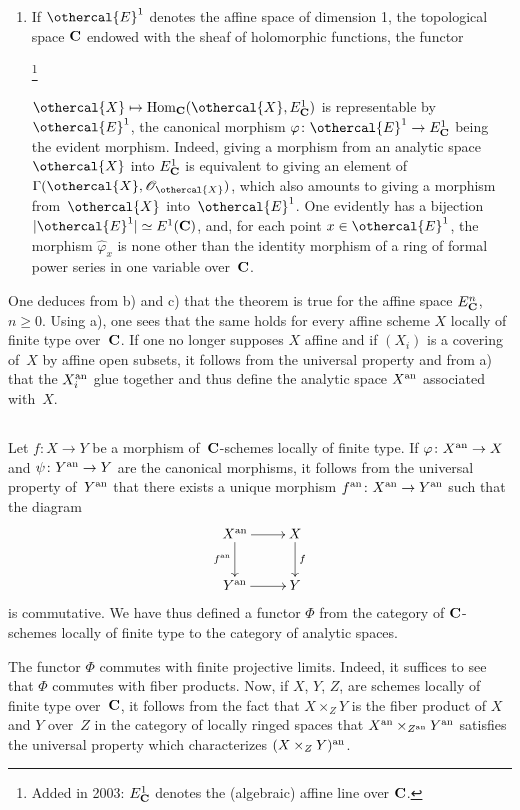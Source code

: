 \begin{enumerate}
\item [c)] If $\othercal{E}^1$ denotes the affine space of dimension 1,
\ie the topological space $\mathbf{C}$ endowed with the sheaf of holomorphic
functions, the functor%
{{\renewcommand{\thefootnote}{*}\addtocounter{footnote}{-1}\footnote{\lcrochetbf Added in 2003: $E^1_{\mathbf{C}}$ denotes the (algebraic) affine line over $\mathbf{C}$.\rcrochetbf}}}
$\othercal{X}\mto\Hom_\CC (\othercal{X},E^1_\CC)$
is representable by $\othercal{E}^1$, the canonical morphism
$\varphi\colon\othercal{E}^1\to E^1_\CC$ being the
evident morphism. Indeed, giving a morphism from an analytic space
$\othercal{X}$ into $E^1_{\mathbf{C}}$ is equivalent to giving an
element of~$\Gamma(\othercal{X},\cal{O}_\othercal{X})$, which also amounts
to giving a morphism from~$\othercal{X}$ into~$\othercal{E}^1$. One
evidently has a bijection $|\othercal{E}^1|\simeq E^1(\CC)$, and, for
each point $x\in\othercal{E}^1$, the morphism $\widehat\varphi_x$ is
none other than the identity morphism of a ring of formal power series
in one variable over~$\mathbf{C}$.
\end{enumerate}

One deduces from b) and c) that the theorem is true for
the affine space $E^n_{\mathbf{C}}$, $n\geq 0$. Using a), one sees that the same
holds for every affine scheme $X$ locally of finite
type over~$\mathbf{C}$. If one no longer supposes $X$ affine and if $(X_i)$ is
a covering of~$X$ by affine open subsets, it follows from the
universal property and from a) that the $X_i^{\mathrm{an}}$ glue together
and thus define the analytic space $X^{\mathrm{an}}$ associated
with~$X$.

\subsection{}
\label{XII.1.2}
Let $f\colon X\to Y$ be a morphism of~$\mathbf{C}$-schemes locally of
finite type. If $\varphi\colon X^{\an}\to X$ and $\psi\colon Y^{\an}\to
Y$ are the canonical morphisms, it follows from the
universal property of~$Y^{\mathrm{an}}$ that there exists a unique
morphism $f^{\an}\colon X^{\an}\to Y^{\an}$ such that the diagram
$$
\xymatrix{
X^{\an} \ar[r]\ar[d]_-{f^{\an}}& X\ar[d]^-f\\ Y^{\an} \ar[r]& Y
}
$$
is
commutative. We have thus defined a functor $\Phi$ from the
category of $\mathbf{C}$-schemes locally of finite type to the
category of analytic spaces.

The functor $\Phi$ commutes with finite projective limits. Indeed, it
suffices to see that $\Phi$ commutes with fiber products. Now, if
$X$, $Y$, $Z$, are schemes locally of finite type over~$\mathbf{C}$,
it follows from the fact that $X\times_Z Y$ is the fiber product of
$X$ and $Y$ over~$Z$ in the category of locally ringed
spaces that $X^{\mathrm{an}}\times_{Z^{\mathrm{an}}}Y^{\mathrm{an}}$
satisfies the universal property which characterizes
$(X\times_Z Y)^{\mathrm{an}}$.

